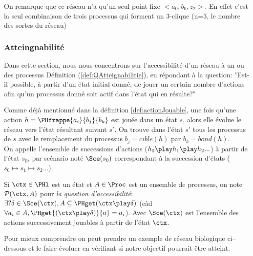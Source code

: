 On remarque que ce réseau n'a qu'un seul point fixe $<a_0,b_0,z_2>$. En effet c'est la seul combinaison de trois processus qui forment un 3-clique (n=3, le nombre des sortes du réseau)

\subsubsection{Atteingnabilité}
\label{secAtteignabilite}
Dans cette section, nous nous concentrons sur l'accessibilité d’un réseau à un ou des processus Définition (\ref{def:QAtteignabilitie}), en répondant à la question: 
"Est-il possible, à partir d'un état initial donné, de jouer un certain nombre d’actions afin qu'un processus donné soit actif dans l'état qui en résulte?"

Comme déjà mentionné dans la définition \ref{def:actionJouable}, une fois qu'une action $h = \PHfrappe{a_i}{b_j}{b_k}$ est jouée dans un état $s$, alors elle évolue le réseau vers l'état résultant suivant $s'$.  On trouve dans l'état $s'$ tous les processus de $s$ avec le remplacement du processus $b_j=cible(h)$ par $b_k=bond(h)$.\\
On appelle l'ensemble de successions d'actions ($h_0 \play h_1 \play h_2...$) à partir de l'état $s_0$, par scénario noté $\Sce(s_0)$ correspondant à la succession d'états ($s_0 \mapsto s_1 \mapsto s_2 ...$).

\begin{definition}
  Si $\ctx \in \PHl$ est un état et $A \in \Proc$ est un ensemble de processus, on note $\mathcal{P}(\ctx, A)$ pour \emph{la question d'accessibilité}:
 $\exists? \delta \in \Sce(\ctx), A \subseteq \PHget(\ctx \play \delta) $ (càd $\forall a_i \in A, \PHget{(\ctx \play \delta)}{a}=a_i$).
Avec $\Sce(\ctx)$ est l'ensemble des actions successivement jouables à partir de l'état $\ctx$. 
\label{def:QAtteignabilitie}
\end{definition}

Pour mieux comprendre on peut prendre un exemple de réseau biologique ci–dessous et le faire évoluer en vérifiant si notre objectif pourrait être atteint.

